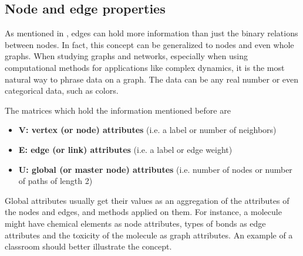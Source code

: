   


\subsection{Node and edge properties}
  As mentioned in , edges can hold more information
  than just the binary relations between nodes. In fact, this concept can
  be generalized to nodes and even whole graphs. When studying graphs and
  networks, especially when using computational methods for applications
  like complex dynamics, it is the most natural way to phrase data on a
  graph. The data can be any real number or even categorical data, such
  as colors.

  The matrices which hold the information mentioned before are
  \begin{itemize}
  \item \textbf{V: vertex (or node) attributes} (i.e. a label or
number of neighbors)
  \item \textbf{E: edge (or link) attributes} (i.e. a label or edge
weight)
  \item \textbf{U: global (or master node) attributes} (i.e. number of
nodes or number of paths of length 2)
  \end{itemize}

  Global attributes usually get their values as an aggregation of the
  attributes of the nodes and edges, and methods applied on them.
  For instance, a molecule might have chemical elements as node
  attributes, types of bonds as edge attributes and the toxicity of
  the molecule as graph attributes.  An example of a classroom should
  better illustrate the concept.
\newpage

  

